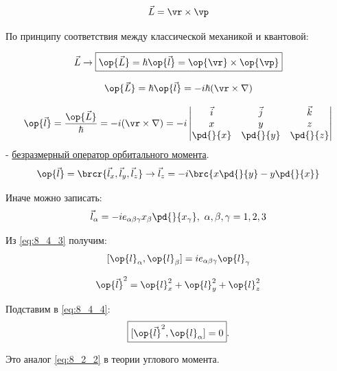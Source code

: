 $$
\vec{L} = \vr \times \vp
$$

По принципу соответствия между классической механикой и квантовой:

\begin{equation}
\label{eq:8_4_1}
  \vec{L} \to \boxed{\op{\vec{L}} = \hbar \op{\vec{l}} = \op{\vr} \times \op{\vp}}
\end{equation}

\begin{equation}
\label{eq:8_4_2}
  \op{\vec{L}} = \hbar \op{\vec{l}} = -i\hbar(\vr \times \nabla)
\end{equation}

$$
\op{\vec{l}} = \frac{\op{\vec L}}{\hbar} = -i(\vr \times \nabla) = -i \left| 
  \begin{matrix}
  \vec{i} & \vec{j} & \vec{k}\\
  x & y & z\\
  \pd{}{x} & \pd{}{y} & \pd{}{z}\\
  \end{matrix}
  \right |
$$
- \underline{безразмерный оператор орбитального момента}.
$$
\op{\vec l} = \brcr{\vec{l}_x, \vec{l}_y, \vec{l}_z} \to \vec{l}_z = -i \brc{x \pd{}{y} - y \pd{}{x}}
$$

Иначе можно записать:
\begin{equation}
\label{eq:8_4_3}
  \vec{l}_\alpha = -i e_{\alpha \beta \gamma} x_\beta \pd{}{x_\gamma},~\alpha, \beta, \gamma = 1, 2, 3
\end{equation}

Из \eqref{eq:8_4_3} получим:
\begin{equation}
\label{eq:8_4_4}
  [\op{l}_\alpha, \op{l}_\beta] = i e_{\alpha \beta \gamma} \op{l}_\gamma
\end{equation}

$$
\op{\vec{l}}^2 = \op{l}^2_x + \op{l}^2_y + \op{l}^2_z
$$

Подставим в \eqref{eq:8_4_4}: 
\begin{equation}
\label{eq:8_4_5}
  \boxed{[\op{\vec{l}}^2, \op{l}_\alpha] = 0}.
\end{equation}

Это аналог \eqref{eq:8_2_2} в теории углового момента.

